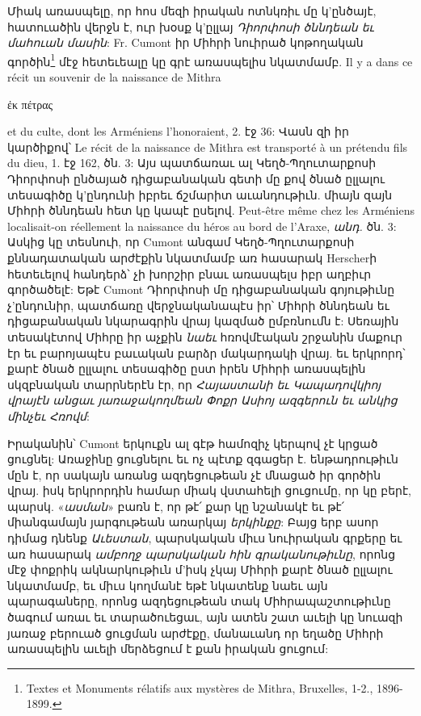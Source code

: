 \documentclass{article}
\begin{document}
{Միակ առասպելը, որ հոս մեզի իրական ոտնկռիւ մը կ'ընծայէ, հատուածին վերջն է, ուր խօսք կ'ըլլայ \emph{Դիորփոսի ծննդեան եւ մահուան մասին}: Fr. Cumont իր Միհրի նուիրած կոթողական գործին\footnote{Textes et Monuments rélatifs aux mystères de Mithra, Bruxelles, 1-2., 1896-1899.} մէջ հետեւեալը կը գրէ առասպելիս նկատմամբ. Il y a dans ce récit un souvenir de la naissance de Mithra \begin{greek}ἐκ πέτρας\end{greek} et du culte, dont les Arméniens l'honoraient, 2. էջ 36: Վասն զի իր կարծիքով՝ Le récit de la naissance de Mithra est transporté à un prétendu fils du dieu, 1. էջ 162, ծն. 3: Այս պատճառաւ ալ Կեղծ-Պղուտարքոսի Դիորփոսի ընծայած դիցաբանական գետի մը քով ծնած ըլլալու տեսագիծը կ'ընդունի իբրեւ ճշմարիտ աւանդութիւն. միայն զայն Միհրի ծննդեան հետ կը կապէ ըսելով. Peut-être même chez les Arméniens localisait-on réellement la naissance du héros au bord de l'Araxe, \emph{անդ.} ծն. 3: Ասկից կը տեսնուի, որ Cumont անգամ Կեղծ-Պղուտարքոսի քննադատական արժէքին նկատմամբ առ հասարակ Herscherի հետեւելով հանդերձ՝ չի խորշիր բնաւ առասպելս իբր աղբիւր գործածելէ: Եթէ Cumont Դիորփոսի մը դիցաբանական գոյութիւնը չ'ընդունիր, պատճառը վերջնականապէս իր՝ Միհրի ծննդեան եւ դիցաբանական նկարագրին վրայ կազմած ըմբռնումն է: Սեռային տեսակէտով Միհրը իր աչքին \emph{նաեւ} հռովմէական շրջանին մաքուր էր եւ բարոյապէս բաւական բարձր մակարդակի վրայ. եւ երկրորդ՝ քարէ ծնած ըլլալու տեսագիծը ըստ իրեն Միհրի առասպելին սկզբնական տարրներէն էր, որ \emph{Հայաստանի եւ Կապադովկիոյ վրայէն անցաւ յառաջակողմեան Փոքր Ասիոյ ազգերուն եւ անկից մինչեւ Հռովմ}:

Իրականին՝ Cumont երկուքն ալ գէթ համոզիչ կերպով չէ կրցած ցուցնել: Առաջինը ցուցնելու եւ ոչ պէտք զգացեր է. ենթադրութիւն մըն է, որ սակայն առանց ազդեցութեան չէ մնացած իր գործին վրայ. իսկ երկրորդին համար միակ վստահելի ցուցումը, որ կը բերէ, պարսկ. «\emph{ասման}» բառն է, որ թէ՛ քար կը նշանակէ եւ թէ՛ միանգամայն յարգութեան առարկայ \emph{երկինքը}: Բայց երբ ասոր դիմաց դնենք \emph{Աւեստան}, պարսկական միւս նուիրական գրքերը եւ առ հասարակ \emph{ամբողջ պարսկական հին գրականութիւնը}, որոնց մէջ փոքրիկ ակնարկութիւն մ'իսկ չկայ Միհրի քարէ ծնած ըլլալու նկատմամբ, եւ միւս կողմանէ եթէ նկատենք նաեւ այն պարագաները, որոնց ազդեցութեան տակ Միհրապաշտութիւնը ծագում առաւ եւ տարածուեցաւ, այն ատեն շատ աւելի կը նուազի յառաջ բերուած ցուցման արժէքը, մանաւանդ որ եղածը Միհրի առասպելին աւելի մերձեցում է քան իրական ցուցում:

}
\end{document}
